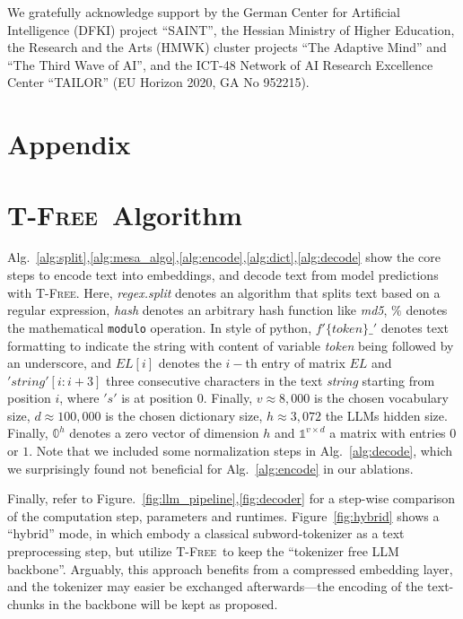 \documentclass[11pt]{article}
\newcommand{\method}{\textsc{T-Free}}
\begin{document}
We gratefully acknowledge support by the German Center for Artificial Intelligence (DFKI) project “SAINT”,
the Hessian Ministry of Higher Education, the Research and the Arts (HMWK) cluster projects
“The Adaptive Mind” and “The Third Wave of AI”, and the ICT-48 Network of AI Research Excellence Center “TAILOR” (EU Horizon 2020, GA No 952215). 



\clearpage

\appendix

\section*{Appendix}

\section{\method\ Algorithm}
\label{app:mesa_algo}
Alg.~\ref{alg:split},\ref{alg:mesa_algo},\ref{alg:encode},\ref{alg:dict},\ref{alg:decode} show the core steps to encode text into embeddings, and decode text from model predictions with \method.
Here, \emph{regex.split} denotes an algorithm that splits text based on a regular expression, \emph{hash} denotes an arbitrary hash function like \emph{md5}, $\%$ denotes the mathematical \texttt{modulo} operation.
In style of python, $f'\{token\}\_'$ denotes text formatting to indicate the string with content of variable \emph{token} being followed by an underscore, and $EL[i]$ denotes the $i-$th entry of matrix $EL$ and $'string'[i:i+3]$ three consecutive characters in the text \emph{string} starting from position $i$, where $'s'$ is at position $0$.
Finally, $v\approx 8,000$ is the chosen vocabulary size,
$d\approx 100,000$ is the chosen dictionary size, $h\approx 3,072$ the LLMs hidden size. 
Finally, $\mathbb{0}^h$ denotes a zero vector of dimension $h$ and $\mathbb{1}^{v\times d}$ a matrix with entries $0$ or $1$.
Note that we included some normalization steps in Alg.~\ref{alg:decode}, which we surprisingly found not beneficial for Alg.~\ref{alg:encode} in our ablations.

Finally, refer to Figure.~\ref{fig:llm_pipeline},\ref{fig:decoder} for a step-wise comparison of the computation step, parameters and runtimes. Figure~\ref{fig:hybrid} shows a ``hybrid'' mode, in which embody a classical subword-tokenizer as a text preprocessing step, but utilize \method~to keep the ``tokenizer free LLM backbone''. Arguably, this approach benefits from a compressed embedding layer, and the tokenizer may easier be exchanged afterwards---the encoding of the text-chunks in the backbone will be kept as proposed.
\end{document}

